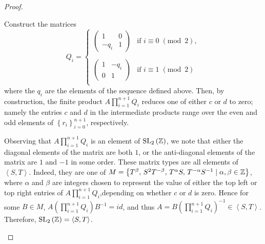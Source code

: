 \documentclass[10pt]{amsart}
\begin{document}
\begin{thm}
\begin{proof}
\begin{enumerate}[(a)]
      Construct the matrices $$Q_i = \left\{
      \begin{array}{ll}
        \left(
        \begin{array}{cc}
          1 & 0\\
          -q_i & 1
        \end{array}
        \right) & 
        \text{if } i \equiv 0\; (\text{mod }\, 2),\\
        \\
        \left(
        \begin{array}{cc}
          1 & -q_i\\
          0 & 1
        \end{array}
        \right) &
        \text{if } i \equiv 1\; (\text{mod }\, 2)\\
      \end{array}
      \right.$$
      where the $q_i$ are the elements of the sequence defined above.
      Then, by construction, the finite product $A\prod_{i=1}^{n+1}Q_i$ reduces one of either $c$ or $d$ to zero; namely the entries $c$ and $d$ in the intermediate products range over the even and odd elements of $\left\{r_i\right\}_{i=0}^{n+1}$, respectively.

      Observing that $A\prod_{i=1}^{n+1}Q_i$ is an element of $\operatorname{SL}_{2}\left(\mathbb{Z}\right)$, we note that either the diagonal elements of the matrix are both $1$, or the anti-diagonal elements of the matrix are $1$ and $-1$ in some order.
      These matrix types are all elements of $\left<S,T\right>$.  
      Indeed, they are one of $M = \left\{T^{\beta},\, S^2T^{-\beta},\, T^{\alpha}S,\, T^{-\alpha}S^{-1} \mid \alpha,\beta \in \mathbb{Z}\right\}$, where $\alpha$ and $\beta$ are integers chosen to represent the value of either the top left or top right entries of $A\prod_{i=1}^{n+1}Q_i$,depending on whether $c$ or $d$ is zero.
      Hence for some $B \in M$, $A \left( \prod_{i=1}^{n+1}Q_i \right)B^{-1} = id$, and thus $A = B\left(\prod_{i=1}^{n+1}Q_i \right)^{-1} \in \left<S,T\right>$.
      Therefore, $\operatorname{SL}_{2}\left(\mathbb{Z}\right) = \left<S,T\right>$.
    \end{enumerate}
  \end{proof}
\end{thm}
\end{document}
